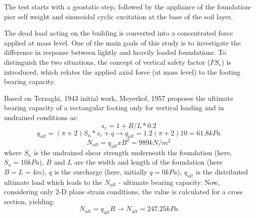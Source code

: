 	The test starts with a geostatic step, followed by the appliance of the foundation-pier self weight and sinusoidal cyclic excitation at the base of the soil layer. 
	
	The dead load acting on the building is converted into a concentrated force applied at mass level. One of the main goals of this study is to investigate the difference in response between lightly and heavily loaded foundations. To distinguish the two situations, the concept of vertical safety factor ($FS_v$) is introduced, which relates the applied axial force (at mass level) to the footing bearing capacity.
	
	Based on Terzaghi, 1943 initial work, Meyerkof, 1957\cite{meyerhof1957ultimate} proposes the ultimate bearing capacity of a rectangular footing only for vertical loading and in undrained conditions as:
	\begin{equation}
		s_c=1+B/L*0.2
	\end{equation}
	\begin{equation}
		q_{ult}=(\pi +2)S_u*s_c + q \longrightarrow q_{ult}=1.2 (\pi+2) 10= 61.8kPa
	\end{equation}
	\begin{equation}
		N_{ult}=q_{ult}xB^2=989 kN/m^2
	\end{equation}
	where $S_u$ is the undrained shear strength underneath the foundation (here, $S_u=10kPa$), $B$ and $L$ are the width and length of the foundation (here $B=L=4m$), $q$ is the surcharge (here, initially $q=0kPa$), $q_{ult}$ is the distributed ultimate load which leads to the $N_{ult}$ - ultimate bearing capacity. Now, considering only 2-D plane strain conditions, the value is calculated for a cross section, yielding:
	\begin{equation}
		N_{ult}=q_{ult} B \longrightarrow N_{ult}=247.25 kPa
	\end{equation}
	
